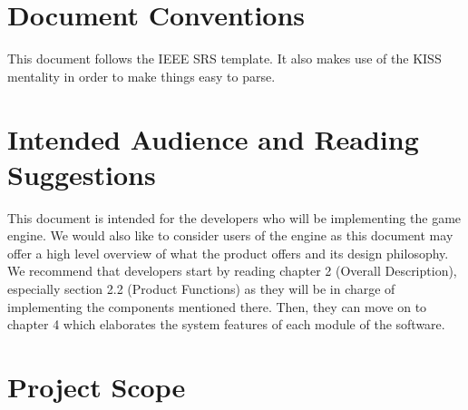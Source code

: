 \documentclass{scrreprt}
\begin{document}

\section{Document Conventions}

This document follows the IEEE SRS template.  It also makes use of the KISS mentality in order to make things easy to parse.


\section{Intended Audience and Reading Suggestions}

This document is intended for the developers who will be implementing the game engine.  We would also like to consider users of the engine as this document may offer a high level overview of what the product offers and its design philosophy. We recommend that developers start by reading chapter 2 (Overall Description), especially section 2.2 (Product Functions) as they will be in charge of implementing the components mentioned there. Then, they can move on to chapter 4 which elaborates the system features of each module of the software.

\section{Project Scope}
\end{document}

